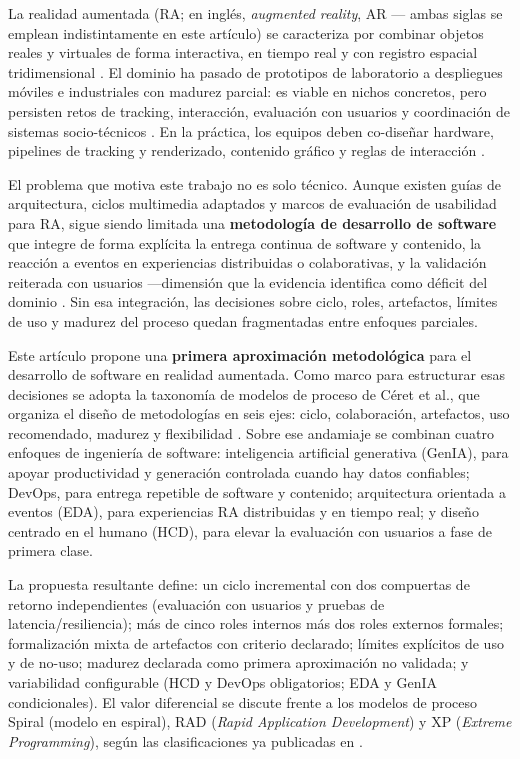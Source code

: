 \documentclass[conference]{IEEEtran}
\begin{document}
La realidad aumentada (RA; en inglés, \textit{augmented reality}, AR --- ambas siglas se emplean indistintamente en este artículo) se caracteriza por combinar objetos reales y virtuales de forma interactiva, en tiempo real y con registro espacial tridimensional \cite{Azuma1997}. El dominio ha pasado de prototipos de laboratorio a despliegues móviles e industriales con madurez parcial: es viable en nichos concretos, pero persisten retos de tracking, interacción, evaluación con usuarios y coordinación de sistemas socio-técnicos \cite{Azuma2001,Goh2023,Graser2024}. En la práctica, los equipos deben co-diseñar hardware, pipelines de tracking y renderizado, contenido gráfico y reglas de interacción \cite{Schmalstieg2016,Devagiri2024}.

El problema que motiva este trabajo no es solo técnico. Aunque existen guías de arquitectura, ciclos multimedia adaptados y marcos de evaluación de usabilidad para RA, sigue siendo limitada una \textbf{metodología de desarrollo de software} que integre de forma explícita la entrega continua de software y contenido, la reacción a eventos en experiencias distribuidas o colaborativas, y la validación reiterada con usuarios —dimensión que la evidencia identifica como déficit del dominio \cite{Vaquero2020,Graser2024}. Sin esa integración, las decisiones sobre ciclo, roles, artefactos, límites de uso y madurez del proceso quedan fragmentadas entre enfoques parciales.

Este artículo propone una \textbf{primera aproximación metodológica} para el desarrollo de software en realidad aumentada. Como marco para estructurar esas decisiones se adopta la taxonomía de modelos de proceso de Céret et al., que organiza el diseño de metodologías en seis ejes: ciclo, colaboración, artefactos, uso recomendado, madurez y flexibilidad \cite{Ceret2013}. Sobre ese andamiaje se combinan cuatro enfoques de ingeniería de software: inteligencia artificial generativa (GenIA), para apoyar productividad y generación controlada cuando hay datos confiables; DevOps, para entrega repetible de software y contenido; arquitectura orientada a eventos (EDA), para experiencias RA distribuidas y en tiempo real; y diseño centrado en el humano (HCD), para elevar la evaluación con usuarios a fase de primera clase.

La propuesta resultante define: un ciclo incremental con dos compuertas de retorno independientes (evaluación con usuarios y pruebas de latencia/resiliencia); más de cinco roles internos más dos roles externos formales; formalización mixta de artefactos con criterio declarado; límites explícitos de uso y de no-uso; madurez declarada como primera aproximación no validada; y variabilidad configurable (HCD y DevOps obligatorios; EDA y GenIA condicionales). El valor diferencial se discute frente a los modelos de proceso Spiral (modelo en espiral), RAD (\textit{Rapid Application Development}) y XP (\textit{Extreme Programming}), según las clasificaciones ya publicadas en \cite{Ceret2013}.
\end{document}
